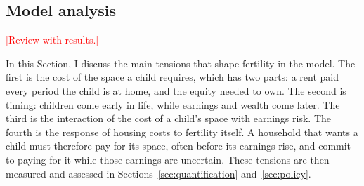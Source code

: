 \subsection{Model analysis}
\label{sec:m-analysis}

\textcolor{red}{[Review with results.]}

In this Section, I discuss the main tensions that shape fertility in the
model. The first is the cost of the space a child requires, which has two
parts: a rent paid every period the child is at home, and the equity needed
to own. The second is timing: children come early in life, while earnings
and wealth come later. The third is the interaction of the cost of a child's
space with earnings risk. The fourth is the response of housing costs to
fertility itself. A household that wants a child must therefore pay for its
space, often before its earnings rise, and commit to paying for it while
those earnings are uncertain. These tensions are then measured and assessed
in Sections~\ref{sec:quantification} and~\ref{sec:policy}.
